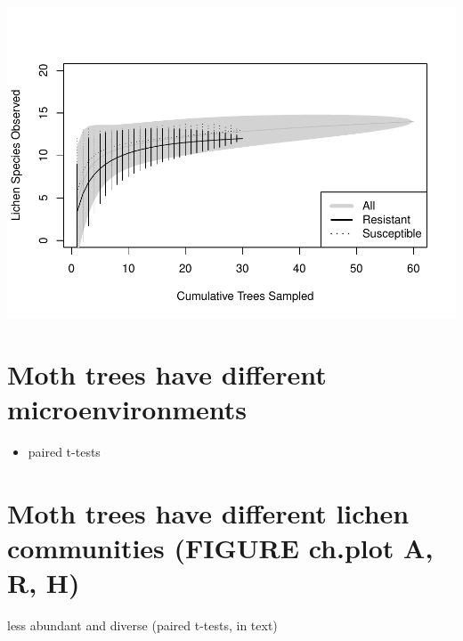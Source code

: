 \documentclass[]{article}
\providecommand{\tightlist}{%
  \setlength{\itemsep}{0pt}\setlength{\parskip}{0pt}}
\begin{document}
\includegraphics{rln_files/figure-latex/specacum-1.pdf}

\section{Moth trees have different
microenvironments}\label{moth-trees-have-different-microenvironments}

\begin{itemize}
\tightlist
\item
  paired t-tests
\end{itemize}

\section{Moth trees have different lichen communities (FIGURE ch.plot A,
R,
H)}\label{moth-trees-have-different-lichen-communities-figure-ch.plot-a-r-h}

less abundant and diverse (paired t-tests, in text)
\end{document}
